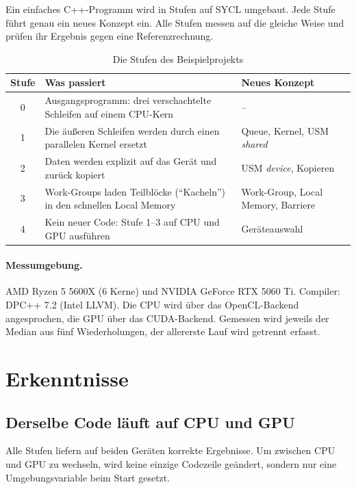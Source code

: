 \documentclass[11pt]{article}
\begin{document}
Ein einfaches C++-Programm wird in Stufen auf SYCL umgebaut. Jede Stufe
führt genau ein neues Konzept ein. Alle Stufen messen auf die gleiche Weise
und prüfen ihr Ergebnis gegen eine Referenzrechnung.

\begin{table}[h]
\centering
\begin{tabularx}{\textwidth}{@{}c>{\raggedright\arraybackslash}X>{\raggedright\arraybackslash}X@{}}
\toprule
\textbf{Stufe} & \textbf{Was passiert} & \textbf{Neues Konzept} \\
\midrule
0 & Ausgangsprogramm: drei verschachtelte Schleifen auf einem CPU-Kern & -- \\
1 & Die äußeren Schleifen werden durch einen parallelen Kernel ersetzt & Queue, Kernel, USM \emph{shared} \\
2 & Daten werden explizit auf das Gerät und zurück kopiert & USM \emph{device}, Kopieren \\
3 & Work-Groups laden Teilblöcke (\enquote{Kacheln}) in den schnellen Local Memory & Work-Group, Local Memory, Barriere \\
4 & Kein neuer Code: Stufe 1--3 auf CPU und GPU ausführen & Geräteauswahl \\
\bottomrule
\end{tabularx}
\caption{Die Stufen des Beispielprojekts}
\end{table}

\paragraph{Messumgebung.}
AMD Ryzen 5 5600X (6 Kerne) und NVIDIA GeForce RTX 5060 Ti. Compiler:
DPC++ 7.2 (Intel LLVM). Die CPU wird über das OpenCL-Backend angesprochen,
die GPU über das CUDA-Backend. Gemessen wird jeweils der Median aus fünf
Wiederholungen, der allererste Lauf wird getrennt erfasst.

\section{Erkenntnisse}

\subsection{Derselbe Code läuft auf CPU und GPU}

Alle Stufen liefern auf beiden Geräten korrekte Ergebnisse. Um zwischen
CPU und GPU zu wechseln, wird keine einzige Codezeile geändert, sondern
nur eine Umgebungsvariable beim Start gesetzt.
\end{document}
